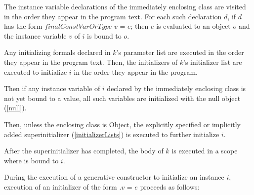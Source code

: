 \documentclass{article}
\newcommand{\code}[1]{{\sf #1}}
\begin{document}
\LMHash{}
The instance variable declarations of the immediately enclosing class are visited in the order they appear in the program text.
For each such declaration $d$, if $d$ has the form \code{$finalConstVarOrType$ $v$ = $e$; }
then $e$ is evaluated to an object $o$
and the instance variable $v$ of $i$ is bound to $o$.

\LMHash{}
Any initializing formals declared in $k$'s parameter list are executed in the order they appear in the program text.
Then, the initializers of $k$'s initializer list are executed to initialize $i$
in the order they appear in the program.


\LMHash{}
Then if any instance variable of $i$ declared by the immediately enclosing class
is not yet bound to a value,
all such variables are initialized with the null object (\ref{null}).

\LMHash{}
Then, unless the enclosing class is \code{Object}, the explicitly specified or
implicitly added superinitializer (\ref{initializerLists}) is executed to
further initialize $i$.


\LMHash{}
After the superinitializer has completed, the body of $k$ is executed in a scope where \THIS{} is bound to $i$.


\LMHash{}
During the execution of a generative constructor to initialize an instance $i$,
execution of an initializer of the form \code{\THIS{}.$v$ = $e$}
proceeds as follows:
\end{document}
